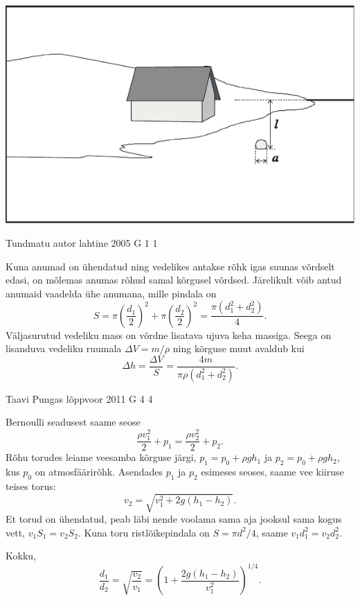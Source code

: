 \documentclass[11pt, twoside]{article}
\begin{document}
{{\begin{center}
	\includegraphics[width=0.9\linewidth]{2008-lahg-09-lah}
\end{center}
\fi
}

{Tundmatu autor} %
{lahtine} %
{2005} %
{G 1} %
{1} %
{

\ifSolution
Kuna anumad on ühendatud ning vedelikes antakse rõhk igas suunas võrdselt edasi, on mõlemas anumas rõhud samal kõrgusel võrdsed. Järelikult võib antud anumaid vaadelda ühe anumana, mille pindala on
\[
S=\pi\left(\frac{d_{1}}{2}\right)^{2}+\pi\left(\frac{d_{2}}{2}\right)^{2}=\frac{\pi\left(d_{1}^{2}+d_{2}^{2}\right)}{4}.
\]
Väljasurutud vedeliku mass on võrdne lisatava ujuva keha massiga. Seega on lisanduva vedeliku ruumala $\Delta V = m/\rho$ ning kõrguse muut avaldub kui
\[
\Delta h=\frac{\Delta V}{S}=\frac{4 m}{\pi \rho\left(d_{1}^{2}+d_{2}^{2}\right)}.
\]
\fi
}

{Taavi Pungas} %
{lõppvoor} %
{2011} %
{G 4} %
{4} %
{

\ifSolution
Bernoulli seadusest saame seose 
\[
\frac{\rho v_1^2}{2}+p_1=\frac{\rho v_2^2}{2}+p_2.
\]
Rõhu torudes leiame veesamba kõrguse järgi, $p_1=p_0 + \rho g h_1$ ja $p_2=p_0 + \rho g h_2$, kus $p_0$ on atmosfäärirõhk.
Asendades $p_1$ ja $p_2$ esimeses seoses, saame vee kiiruse teises torus:
\[
v_2=\sqrt{v_1^2+2g(h_1-h_2)}.
\]
Et torud on ühendatud, peab läbi nende voolama sama aja jooksul sama kogus vett, $v_1 S_1 = v_2 S_2$.
Kuna toru ristlõikepindala on $S=\pi d^2 / 4$, saame $v_1 d_1^2 = v_2 d_2^2$.

Kokku,
\[
\frac{d_1}{d_2}=\sqrt{\frac{v_2}{v_1}}=\left(1+\frac{2g(h_1-h_2)}{v_1^2}\right)^{1/4}.
\]
\fi
}

}
\end{document}
